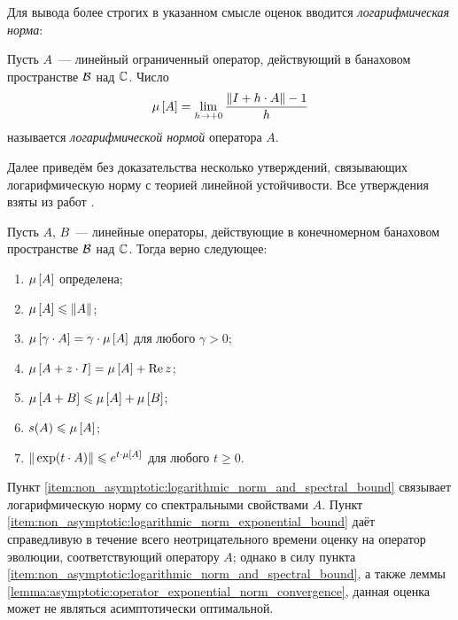 Для вывода более строгих в указанном смысле оценок вводится \emph{логарифмическая норма}:

\begin{definition}
    \label{definition:non_asymptotic:logarithmic_norm}
    Пусть $ A $~--- линейный ограниченный оператор, действующий в банаховом пространстве $ \mathcal{B} $ над $ \mathbb{C} $.
    Число
    \begin{equation}
        \label{eq:logarithmic_norm}
        \mu \left[ A \right] = \lim_{h \to +0} \frac{\| I + h \cdot A \| - 1}{h}
    \end{equation}
    называется \emph{логарифмической нормой} оператора $ A $.
\end{definition}

Далее приведём без доказательства несколько утверждений,
связывающих логарифмическую норму с теорией линейной устойчивости.
Все утверждения взяты из работ \cite{soderlind2006lognorm, lambert1991methods}.

\begin{statement}
    \label{statement:non_asymptotic:logarithmic_norm_properties}
    Пусть $ A $, $ B $~--- линейные операторы, действующие в конечномерном банаховом пространстве $ \mathcal{B} $ над $ \mathbb{C} $.
    Тогда верно следующее:
    \begin{enumerate}[itemsep=0em]
        \item $ \mu \left[ A \right] $ определена;
        \item $ \mu \left[ A \right] \leqslant \| A \| $;
        \item $ \mu \left[ \gamma \cdot A \right] = \gamma \cdot \mu \left[ A \right] $ для любого $ \gamma > 0 $;
        \item $ \mu \left[ A + z \cdot I \right] = \mu \left[ A \right] + \operatorname{Re} z $;
        \item $ \mu \left[ A + B \right] \leqslant \mu \left[ A \right] + \mu \left[ B \right] $;
        \item $ s(A) \leqslant \mu \left[ A \right] $; \label{item:non_asymptotic:logarithmic_norm_and_spectral_bound}
        \item $ \| \exp(t \cdot A) \| \leqslant e^{t \cdot \mu \left[ A \right]} $ для любого $ t \geqslant 0 $. \label{item:non_asymptotic:logarithmic_norm_exponential_bound}
    \end{enumerate}
\end{statement}

Пункт \ref{item:non_asymptotic:logarithmic_norm_and_spectral_bound}
связывает логарифмическую норму со спектральными свойствами $ A $.
Пункт \ref{item:non_asymptotic:logarithmic_norm_exponential_bound}
даёт справедливую в течение всего неотрицательного времени оценку на оператор эволюции,
соответствующий оператору $ A $;
однако в силу пункта \ref{item:non_asymptotic:logarithmic_norm_and_spectral_bound},
а также леммы \ref{lemma:asymptotic:operator_exponential_norm_convergence},
данная оценка может не являться асимптотически оптимальной.

